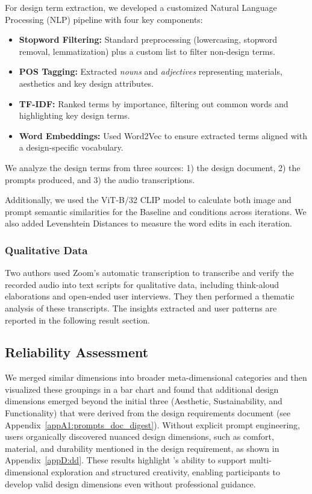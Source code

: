 For design term extraction, we developed a customized Natural Language Processing (NLP) pipeline with four key components:

\begin{itemize}
    \item \textbf{Stopword Filtering:} Standard preprocessing (lowercasing, stopword removal, lemmatization) plus a custom list to filter non-design terms.
    \item \textbf{POS Tagging:} Extracted \textit{nouns} and \textit{adjectives} representing materials, aesthetics and key design attributes.
    \item \textbf{TF-IDF:} Ranked terms by importance, filtering out common words and highlighting key design terms.
    \item \textbf{Word Embeddings:} Used Word2Vec to ensure extracted terms aligned with a design-specific vocabulary.
\end{itemize}

We analyze the design terms from three sources: 1) the design document, 2) the prompts produced, and 3) the audio transcriptions.

Additionally, we used the ViT-B/32 CLIP model \cite{radford2021learning} to calculate both image and prompt semantic similarities for the Baseline and \toolname{} conditions across iterations. We also added Levenshtein Distances to measure the word edits in each iteration.

\subsubsection{Qualitative Data}
Two authors used Zoom's automatic transcription to transcribe and verify the recorded audio into text scripts for qualitative data, including think-aloud elaborations and open-ended user interviews. They then performed a thematic analysis of these transcripts. The insights extracted and user patterns are reported in the following result section. 

\subsection{Reliability Assessment}

We merged similar dimensions into broader meta-dimensional categories and then visualized these groupings in a bar chart and found that additional design dimensions emerged beyond the initial three (Aesthetic, Sustainability, and Functionality) that were derived from the design requirements document (see Appendix~\ref{appA1:prompts_doc_digest}). Without explicit prompt engineering, \toolname{} users organically discovered nuanced design dimensions, such as comfort, material, and durability mentioned in the design requirement, as shown in Appendix~\ref{appD:dd}. These results highlight \toolname{}'s ability to support multi-dimensional exploration and structured creativity, enabling participants to develop valid design dimensions even without professional guidance.

